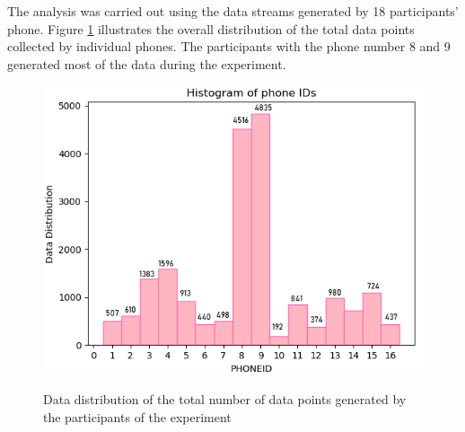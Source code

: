 
The analysis was carried out using the data streams generated by 18 participants' phone. Figure \ref{userphone} illustrates the overall distribution of the total data points collected by individual phones. The participants with the phone number 8 and 9 generated most of the data during the experiment.  


\begin{figure}[!ht]
    \centering
    \includegraphics[width=.7\textwidth]{image/Chapters/Chapter6/phoneID_data.png}
    \\[\smallskipamount]    
    \caption{Data distribution of the total number of data points generated by the participants of the experiment}
    \label{userphone}
\end{figure}







